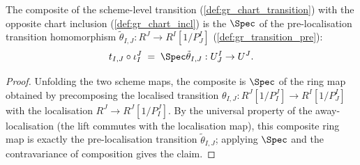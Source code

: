 \begin{lemma}

  \label{lem:gr_chartTransition_comp_chartIncl}
  The composite of the scheme-level transition
  (\cref{def:gr_chart_transition}) with the opposite chart inclusion
  (\cref{def:gr_chart_incl}) is the \(\Spec\) of the pre-localisation transition
  homomorphism \(\tilde\theta_{I,J} : R^J \to R^I[1/P^I_J]\)
  (\cref{def:gr_transition_pre}):
  \[
    t_{I,J} \circ \iota^J_I \;=\; \Spec \tilde\theta_{I,J} :
      U^I_J \to U^J .
  \]
\end{lemma}
\begin{proof}
  \leanok
  Unfolding the two scheme maps, the composite is \(\Spec\) of the ring map
  obtained by precomposing the localised transition \(\theta_{I,J} :
  R^J[1/P^J_I] \to R^I[1/P^I_J]\) with the localisation \(R^J \to R^J[1/P^J_I]\).
  By the universal property of the away-localisation (the lift commutes with the
  localisation map), this composite ring map is exactly the pre-localisation
  transition \(\tilde\theta_{I,J}\); applying \(\Spec\) and the contravariance of
  composition gives the claim.
\end{proof}

